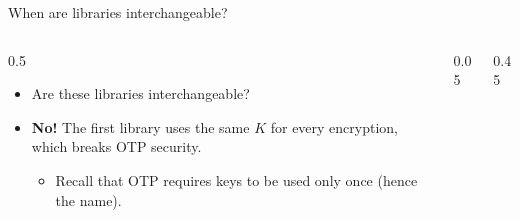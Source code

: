 \ifdefined\PRESENTATION\else\PassOptionsToClass{handout}{beamer}\fi\documentclass[aspectratio=169, lualatex]{beamer}
\begin{document}
\begin{frame}{When are libraries interchangeable?}
	\begin{columns}[c]
		\begin{column}{0.5\textwidth}
			\begin{itemize}[<+->]
				\item Are these libraries interchangeable?
				\item \textbf{No!} The first library uses the same $K$ for every encryption, which breaks OTP security.
				      \begin{itemize}
					      \item Recall that OTP requires keys to be used only once (hence the name).
				      \end{itemize}
			\end{itemize}
		\end{column}
		\begin{column}{0.05\textwidth}
		\end{column}
		\begin{column}{0.45\textwidth}
		\end{column}
	\end{columns}
\end{frame}
\end{document}
